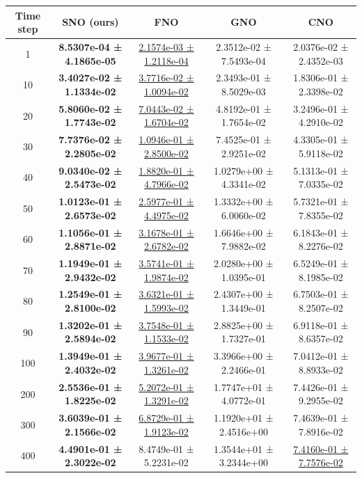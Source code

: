 \documentclass{article}
\theoremstyle{plain}
\theoremstyle{definition}
\theoremstyle{remark}
\begin{document}
\begin{table}[htbp]
\centering
\small
\setlength{\tabcolsep}{6pt}
\begin{tabular}{ccccc}
\hline
Time step & SNO (ours) & FNO & GNO & CNO \\
\hline
1   & \textbf{8.5307e-04 ± 4.1865e-05} & \underline{2.1574e-03 ± 1.2118e-04} & 2.3512e-02 ± 7.5493e-04 & 2.0376e-02 ± 2.4352e-03 \\
10  & \textbf{3.4027e-02 ± 1.1334e-02} & \underline{3.7716e-02 ± 1.0094e-02} & 2.3493e-01 ± 8.5029e-03 & 1.8306e-01 ± 2.3398e-02 \\
20  & \textbf{5.8060e-02 ± 1.7743e-02} & \underline{7.0443e-02 ± 1.6704e-02} & 4.8192e-01 ± 1.7654e-02 & 3.2496e-01 ± 4.2910e-02 \\
30  & \textbf{7.7376e-02 ± 2.2805e-02} & \underline{1.0946e-01 ± 2.8500e-02} & 7.4525e-01 ± 2.9251e-02 & 4.3305e-01 ± 5.9118e-02 \\
40  & \textbf{9.0340e-02 ± 2.5473e-02} & \underline{1.8820e-01 ± 4.7966e-02} & 1.0279e+00 ± 4.3341e-02 & 5.1313e-01 ± 7.0335e-02 \\
50  & \textbf{1.0123e-01 ± 2.6573e-02} & \underline{2.5977e-01 ± 4.4975e-02} & 1.3332e+00 ± 6.0060e-02 & 5.7321e-01 ± 7.8355e-02 \\
60  & \textbf{1.1056e-01 ± 2.8871e-02} & \underline{3.1678e-01 ± 2.6782e-02} & 1.6646e+00 ± 7.9882e-02 & 6.1843e-01 ± 8.2276e-02 \\
70  & \textbf{1.1949e-01 ± 2.9432e-02} & \underline{3.5741e-01 ± 1.9874e-02} & 2.0280e+00 ± 1.0395e-01 & 6.5249e-01 ± 8.1985e-02 \\
80  & \textbf{1.2549e-01 ± 2.8100e-02} & \underline{3.6321e-01 ± 1.5993e-02} & 2.4307e+00 ± 1.3449e-01 & 6.7503e-01 ± 8.2507e-02 \\
90  & \textbf{1.3202e-01 ± 2.5894e-02} & \underline{3.7548e-01 ± 1.1533e-02} & 2.8825e+00 ± 1.7327e-01 & 6.9118e-01 ± 8.6357e-02 \\
100 & \textbf{1.3949e-01 ± 2.4032e-02} & \underline{3.9677e-01 ± 1.3261e-02} & 3.3966e+00 ± 2.2466e-01 & 7.0412e-01 ± 8.8933e-02 \\
200 & \textbf{2.5536e-01 ± 1.8225e-02} & \underline{5.2072e-01 ± 1.3291e-02} & 1.7747e+01 ± 4.0772e-01 & 7.4426e-01 ± 9.2955e-02 \\
300 & \textbf{3.6039e-01 ± 2.1566e-02} & \underline{6.8729e-01 ± 1.9123e-02} & 1.1920e+01 ± 2.4516e+00 & 7.4639e-01 ± 7.8916e-02 \\
400 & \textbf{4.4901e-01 ± 2.3022e-02} & 8.4749e-01 ± 5.2231e-02 & 1.3544e+01 ± 3.2344e+00 & \underline{7.4160e-01 ± 7.7576e-02} \\

\end{tabular}
\end{table}
\end{document}
